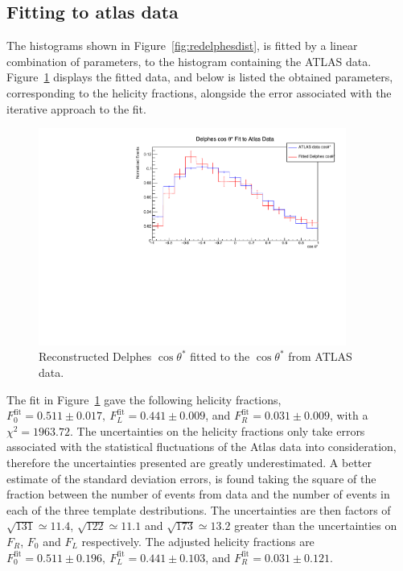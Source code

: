 \documentclass[12pt,a4paper]{article}
\numberwithin{equation}{section}
\begin{document}
\subsection{Fitting to atlas data}
The histograms shown in Figure~\ref{fig:redelphesdist}, is fitted by a linear
combination of parameters, to the histogram containing the ATLAS data.
Figure~\ref{fig:delphesfit} displays the fitted data, and below is listed the
obtained parameters, corresponding to the helicity fractions, alongside the
error associated with the iterative approach to the fit.

\begin{figure}[H]
  \centering
  \includegraphics[width=0.9\textwidth]{figures/delphes_fit}
  \caption{\label{fig:delphesfit}Reconstructed Delphes $\cos \theta^{*}$ fitted to
    the $\cos \theta^{*}$ from ATLAS data.}
\end{figure}


The fit in Figure~\ref{fig:delphesfit} gave the following helicity fractions,
$F_0^{\mathrm{fit}} = 0.511 \pm 0.017,\ F_L^{\mathrm{fit}} = 0.441 \pm 0.009$,
and $F_R^{\mathrm{fit}} = 0.031 \pm 0.009$, with a $\chi^2 = 1963.72$. The
uncertainties on the helicity fractions only take errors associated with the
statistical fluctuations of the Atlas data into consideration, therefore the
uncertainties presented are greatly underestimated. A better estimate of the
standard deviation errors, is found taking the square of the fraction between
the number of events from data and the number of events in each of the three
template destributions. The uncertainties are then factors of
$\sqrt{131} \simeq 11.4$, $\sqrt{122} \simeq 11.1$ and $\sqrt{173} \simeq 13.2$ greater than
the uncertainties on $F_R$, $F_0$ and $F_L$ respectively. The adjusted helicity
fractions are
$F_0^{\mathrm{fit}} = 0.511 \pm 0.196,\ F_L^{\mathrm{fit}} = 0.441 \pm 0.103$,
and $F_R^{\mathrm{fit}} = 0.031 \pm 0.121$.
\end{document}
